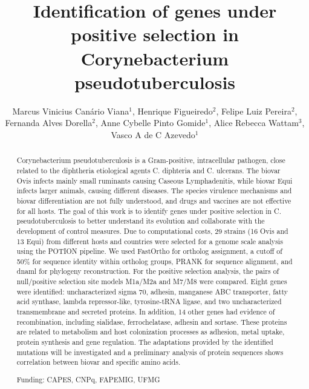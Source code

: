 \documentclass[twoside]{article}
\title{\vspace{-15mm}\fontsize{24pt}{10pt}\selectfont\textbf{Identification of genes under positive selection in Corynebacterium pseudotuberculosis}} %
\author{Marcus Vinicius Can\'ario Viana$^1$, Henrique Figueiredo$^2$, Felipe Luiz Pereira$^2$, Fernanda Alves Dorella$^2$, Anne Cybelle Pinto Gomide$^1$, Alice Rebecca Wattam$^3$, Vasco A de C Azevedo$^1$}
\affil{1 UFMG\\ 2 NATIONAL REFERENCE LABORATORY FOR AQUATIC ANIMAL DISEASES OF MINISTRY OF FISHERIES AND AQUACULTURE, UFMG\\ 3 BIOCOMPLEXITY INSTITUTE OF VIRGINIA TECH, VIRGINIA TECH, BLACKSBURG, VIRGINIA, UNITED STATES OF AMERICA\\ }
\date{}
\begin{document}
\maketitle %

\thispagestyle{fancy} %


\begin{abstract}
Corynebacterium pseudotuberculosis is a Gram-positive, intracellular pathogen, close related to the diphtheria etiological agents C. diphteria and C. ulcerans. The biovar Ovis infects mainly small ruminants causing Caseous Lymphadenitis, while biovar Equi infects larger animals, causing different diseases. The species virulence mechanisms and biovar differentiation are not fully understood, and drugs and vaccines are not effective for all hosts. The goal of this work is to identify genes under positive selection in C. pseudotuberculosis to better understand its evolution and collaborate with the development of control measures. Due to computational costs, 29 strains (16 Ovis and 13 Equi) from different hosts and countries were selected for a genome scale analysis using the POTION pipeline. We used FastOrtho for ortholog assignment, a cutoff of 50\% for sequence identity within ortholog groups, PRANK for sequence alignment, and dnaml for phylogeny reconstruction. For the positive selection analysis, the pairs of null/positive selection site models M1a/M2a and M7/M8 were compared. Eight genes were identified: uncharacterized sigma 70, adhesin, manganese ABC transporter, fatty acid synthase, lambda repressor-like, tyrosine-tRNA ligase, and two uncharacterized transmembrane and secreted proteins. In addition, 14 other genes had evidence of recombination, including sialidase, ferrochelatase, adhesin and sortase. These proteins are related to metabolism and host colonization processes as adhesion, metal uptake, protein synthesis and gene regulation. The adaptations provided by the identified mutations will be investigated and a preliminary analysis of protein sequences shows correlation between biovar and specific amino acids.

Funding: CAPES, CNPq, FAPEMIG, UFMG
\end{abstract}
\end{document}
